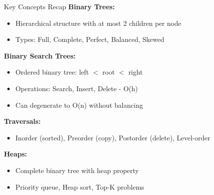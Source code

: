 \documentclass[aspectratio=169]{beamer}
\begin{document}
\begin{frame}{Key Concepts Recap}
  \textbf{Binary Trees:}
  \begin{itemize}
    \item Hierarchical structure with at most 2 children per node
    \item Types: Full, Complete, Perfect, Balanced, Skewed
  \end{itemize}

  \vspace{0.3cm}
  \textbf{Binary Search Trees:}
  \begin{itemize}
    \item Ordered binary tree: left $<$ root $<$ right
    \item Operations: Search, Insert, Delete - O(h)
    \item Can degenerate to O(n) without balancing
  \end{itemize}

  \vspace{0.3cm}
  \textbf{Traversals:}
  \begin{itemize}
    \item Inorder (sorted), Preorder (copy), Postorder (delete), Level-order
  \end{itemize}

  \vspace{0.3cm}
  \textbf{Heaps:}
  \begin{itemize}
    \item Complete binary tree with heap property
    \item Priority queue, Heap sort, Top-K problems
  \end{itemize}
\end{frame}
\end{document}
